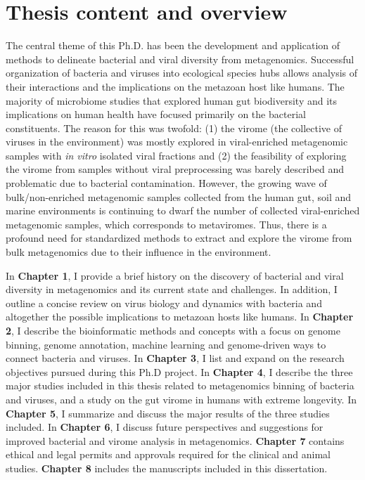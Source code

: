 \chapter{Thesis content and overview}\label{overview}
The central theme of this Ph.D. has been the development and application of methods to delineate bacterial and viral diversity from metagenomics. Successful organization of bacteria and viruses into ecological species hubs allows analysis of their interactions and the implications on the metazoan host like humans. The majority of microbiome studies that explored human gut biodiversity and its implications on human health have focused primarily on the bacterial constituents. The reason for this was twofold: (1) the virome (the collective of viruses in the environment) was mostly explored in viral-enriched metagenomic samples with \textit{in vitro} isolated viral fractions and (2) the feasibility of exploring the virome from samples without viral preprocessing was barely described and problematic due to bacterial contamination. However, the growing wave of bulk/non-enriched metagenomic samples collected from the human gut, soil and marine environments is continuing to dwarf the number of collected viral-enriched metagenomic samples, which corresponds to metaviromes. Thus, there is a profound need for standardized methods to extract and explore the virome from bulk metagenomics due to their influence in the environment.

\medskip
\noindent
In \textbf{Chapter 1}, I provide a brief history on the discovery of bacterial and viral diversity in metagenomics and its current state and challenges. In addition, I outline a concise review on virus biology and dynamics with bacteria and altogether the possible implications to metazoan hosts like humans. In \textbf{Chapter 2}, I describe the bioinformatic methods and concepts with a focus on genome binning, genome annotation, machine learning and genome-driven ways to connect bacteria and viruses. In \textbf{Chapter 3}, I list and expand on the research objectives pursued during this Ph.D project. In \textbf{Chapter 4}, I describe the three major studies included in this thesis related to metagenomics binning of bacteria and viruses, and a study on the gut virome in humans with extreme longevity. In \textbf{Chapter 5}, I summarize and discuss the major results of the three studies included. In \textbf{Chapter 6}, I discuss future perspectives and suggestions for improved bacterial and virome analysis in metagenomics. \textbf{Chapter 7} contains ethical and legal permits and approvals required for the clinical and animal studies. \textbf{Chapter 8} includes the manuscripts included in this dissertation.
